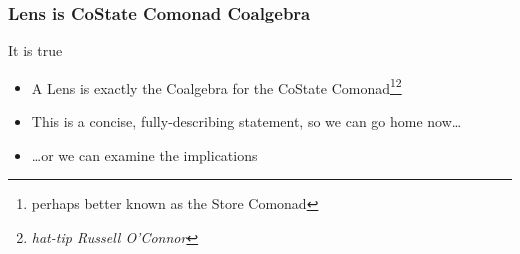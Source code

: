 \begin{frame}
\frametitle{Lens is CoState Comonad Coalgebra}

\begin{block}{It is true}
  \begin{itemize}
  \item A Lens is exactly the Coalgebra for the CoState Comonad\footnote{perhaps better known as the Store Comonad}\footnote{\emph{hat-tip Russell O'Connor}}
  \item This is a concise, fully-describing statement, so we can go home now\ldots
  \item \ldots or we can examine the implications
  \end{itemize}
\end{block}
\end{frame}

